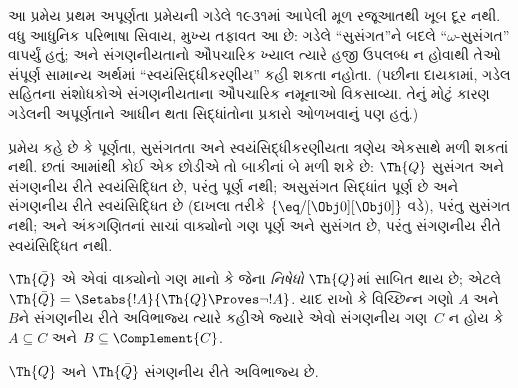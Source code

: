 \begin{explain}
આ પ્રમેય પ્રથમ અપૂર્ણતા
પ્રમેયની ગડેલે ૧૯૩૧માં
આપેલી મૂળ રજૂઆતથી
ખૂબ દૂર નથી.
વધુ આધુનિક પરિભાષા સિવાય,
મુખ્ય તફાવત આ છે:
ગડેલે ``સુસંગત''ને બદલે
``$\omega$-સુસંગત''
વાપર્યું હતું; અને સંગણનીયતાનો
ઔપચારિક ખ્યાલ ત્યારે હજી
ઉપલબ્ધ ન હોવાથી તેઓ
સંપૂર્ણ સામાન્ય અર્થમાં
``સ્વયંસિદ્ધીકરણીય'' કહી
શકતા નહોતા. (પછીના
દાયકામાં, ગડેલ સહિતના
સંશોધકોએ સંગણનીયતાના
ઔપચારિક નમૂનાઓ વિકસાવ્યા.
તેનું મોટું કારણ ગડેલની
અપૂર્ણતાને આધીન થતા
સિદ્ધાંતોના પ્રકારો ઓળખવાનું
પણ હતું.)

પ્રમેય કહે છે કે પૂર્ણતા,
સુસંગતતા અને
સ્વયંસિદ્ધીકરણીયતા
ત્રણેય એકસાથે મળી શકતાં
નથી. છતાં આમાંથી કોઈ
એક છોડીએ તો બાકીનાં બે
મળી શકે છે: $\Th{Q}$
સુસંગત અને સંગણનીય રીતે
સ્વયંસિદ્ધિત છે, પરંતુ
પૂર્ણ નથી; અસુસંગત
સિદ્ધાંત પૂર્ણ છે અને
સંગણનીય રીતે સ્વયંસિદ્ધિત
છે (દાખલા તરીકે
$\{ \eq/[\Obj 0][\Obj 0] \}$ વડે),
પરંતુ સુસંગત નથી; અને
અંકગણિતનાં સાચાં વાક્યોનો
ગણ પૂર્ણ અને સુસંગત છે,
પરંતુ સંગણનીય રીતે
સ્વયંસિદ્ધિત નથી.
\end{explain}
\endgroup


\begingroup
\makeatletter{}\makeatother


\label{guunit:OLP-0309}



$\Th{\bar Q}$ એ એવાં
વાક્યોનો ગણ માનો કે જેના
{\em નિષેધો} $\Th{Q}$માં
સાબિત થાય છે; એટલે
$\Th{\bar Q} = \Setabs{!A}{\Th{Q} \Proves
  \lnot !A}$.
યાદ રાખો કે વિચ્છિન્ન
ગણો $A$ અને $B$ને
સંગણનીય રીતે અવિભાજ્ય
ત્યારે કહીએ જ્યારે એવો
સંગણનીય ગણ~$C$ ન હોય
કે $A \subseteq C$ અને
$B \subseteq \Complement{C}$.

\begin{lem}
$\Th{Q}$ અને
$\Th{\bar Q}$ સંગણનીય
રીતે અવિભાજ્ય છે.
\end{lem}

